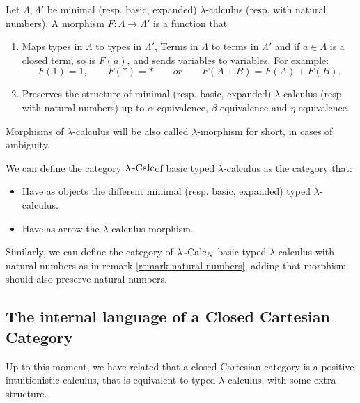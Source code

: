 \begin{definition}
  Let $\Lambda, \Lambda '$ be minimal (resp. basic, expanded) $\lambda$-calculus (resp. with natural numbers). A morphism $F: \Lambda \to \Lambda '$ is a function that
  \begin{enumerate}
  \item Maps types in $\Lambda$ to types in $\Lambda '$, Terms in $\Lambda$ to terms in $\Lambda '$ and if $a\in \Lambda$ is a closed term, so is $F(a)$, and sends variables to variables. For example: $$F(1) = 1, \qquad F(*) = * \qquad or \qquad F(A+B) =F(A)+F(B).$$
    
  \item Preserves the structure of minimal (resp. basic, expanded) $\lambda$-calculus (resp. with natural numbers) up to $\alpha$-equivalence, $\beta$-equivalence and $\eta$-equivalence. 

  \end{enumerate}

  Morphisms of $\lambda$-calculus will be also called $\lambda$-morphism for short, in cases of ambiguity.
\end{definition}


\begin{definition}
  We can define the category $\lambda\operatorname{-Calc}$of basic typed $\lambda$-calculus  as the category that:
  \begin{itemize}
  \item Have as objects the different minimal (resp. basic, expanded) typed $\lambda$-calculus.
  \item Have as arrow the $\lambda$-calculus morphism.
  \end{itemize}
  Similarly, we can define the category of $\lambda\operatorname{-Calc}_N$ basic typed $\lambda$-calculus with natural numbers as in remark \ref{remark-natural-numbers}, adding that morphism should also preserve natural numbers.
\end{definition}

\subsection{The internal language of a Closed Cartesian Category}

Up to this moment, we have related that a closed Cartesian category is a positive intuitionistic calculus, that is equivalent to  typed $\lambda$-calculus, with some extra structure.\\


